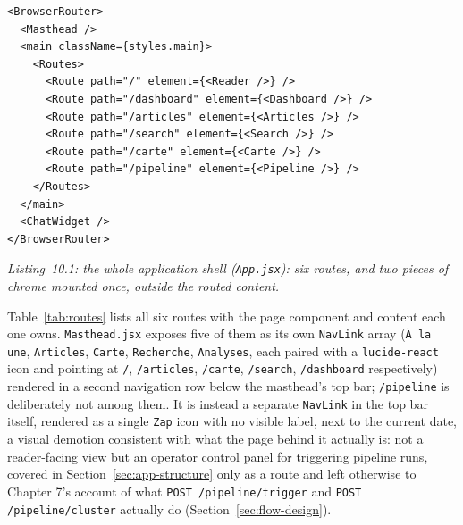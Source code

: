 \begin{verbatim}
<BrowserRouter>
  <Masthead />
  <main className={styles.main}>
    <Routes>
      <Route path="/" element={<Reader />} />
      <Route path="/dashboard" element={<Dashboard />} />
      <Route path="/articles" element={<Articles />} />
      <Route path="/search" element={<Search />} />
      <Route path="/carte" element={<Carte />} />
      <Route path="/pipeline" element={<Pipeline />} />
    </Routes>
  </main>
  <ChatWidget />
</BrowserRouter>
\end{verbatim}
\begin{center}
\textit{Listing~10.1: the whole application shell (\texttt{App.jsx}): six routes, and two pieces of chrome mounted once, outside the routed content.}
\end{center}

\begin{sloppypar}
Table~\ref{tab:routes} lists all six routes with the page component and content each one owns. \texttt{Masthead.jsx} exposes five of them as its own \texttt{NavLink} array (\texttt{À la une}, \texttt{Articles}, \texttt{Carte}, \texttt{Recherche}, \texttt{Analyses}, each paired with a \texttt{lucide-react} icon and pointing at \texttt{/}, \texttt{/articles}, \texttt{/carte}, \texttt{/search}, \texttt{/dashboard} respectively) rendered in a second navigation row below the masthead's top bar; \texttt{/pipeline} is deliberately not among them. It is instead a separate \texttt{NavLink} in the top bar itself, rendered as a single \texttt{Zap} icon with no visible label, next to the current date, a visual demotion consistent with what the page behind it actually is: not a reader-facing view but an operator control panel for triggering pipeline runs, covered in Section~\ref{sec:app-structure} only as a route and left otherwise to Chapter 7's account of what \texttt{POST /pipeline/\allowbreak trigger} and \texttt{POST /pipeline/\allowbreak cluster} actually do (Section~\ref{sec:flow-design}).
\end{sloppypar}

